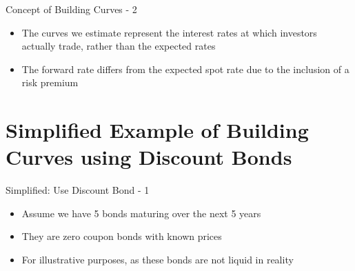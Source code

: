 \documentclass[handout, aspectratio=169]{beamer}
\begin{document}
\begin{frame}{Concept of Building Curves - 2}
	\begin{itemize}
		\footnotesize
		\item The curves we estimate represent the interest rates at which investors actually trade, rather than the expected rates
		\item The forward rate differs from the expected spot rate due to the inclusion of a risk premium
	\end{itemize}
\end{frame}

\section{Simplified Example of Building Curves using Discount Bonds}

\begin{frame}{Simplified: Use Discount Bond - 1}
	\begin{itemize}
		\small
		\item Assume we have 5 bonds maturing over the next 5 years
		\item They are zero coupon bonds with known prices
		\item For illustrative purposes, as these bonds are not liquid in reality
	\end{itemize}
\end{frame}
\end{document}
